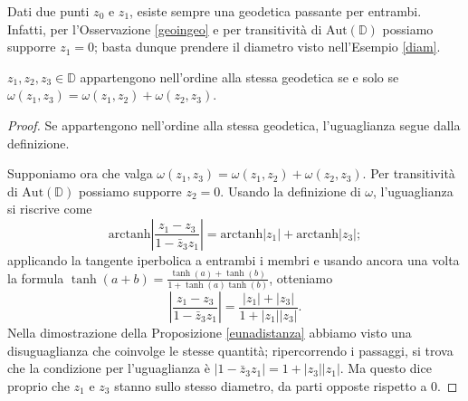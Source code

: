 \begin{oss}
  Dati due punti $z_0$ e $z_1$, esiste sempre una geodetica passante per entrambi. Infatti, per l'Osservazione \ref{geoingeo} e per transitività di $\text{Aut}(\mathbb{D})$ possiamo supporre $z_1=0$; basta dunque prendere il diametro visto nell'Esempio \ref{diam}.
\end{oss}

\begin{lm} \label{nellordine}
  $z_1,z_2,z_3 \in \mathbb{D}$ appartengono nell'ordine alla stessa geodetica se e solo se $\omega(z_1,z_3)=\omega(z_1,z_2)+\omega(z_2,z_3)$.
\end{lm}

\begin{proof}
  Se appartengono nell'ordine alla stessa geodetica, l'uguaglianza segue dalla definizione.

  Supponiamo ora che valga $\omega(z_1,z_3)=\omega(z_1,z_2)+\omega(z_2,z_3)$. Per transitività di $\text{Aut}(\mathbb{D})$ possiamo supporre $z_2=0$. Usando la definizione di $\omega$, l'uguaglianza si riscrive come
  $$\text{arctanh}\left|\frac{z_1-z_3}{1-\bar{z}_3z_1}\right|=\text{arctanh}|z_1|+\text{arctanh}|z_3|;$$
  applicando la tangente iperbolica a entrambi i membri e usando ancora una volta la formula $\tanh(a+b)=\frac{\tanh(a)+\tanh(b)}{1+\tanh(a)\tanh(b)}$, otteniamo
  $$\left|\frac{z_1-z_3}{1-\bar{z}_3z_1}\right|=\frac{|z_1|+|z_3|}{1+|z_1||z_3|}.$$
  Nella dimostrazione della Proposizione \ref{eunadistanza} abbiamo visto una disuguaglianza che coinvolge le stesse quantità; ripercorrendo i passaggi, si trova che la condizione per l'uguaglianza è $|1-\bar{z}_3z_1|=1+|z_3||z_1|$. Ma questo dice proprio che $z_1$ e $z_3$ stanno sullo stesso diametro, da parti opposte rispetto a $0$.
\end{proof}

